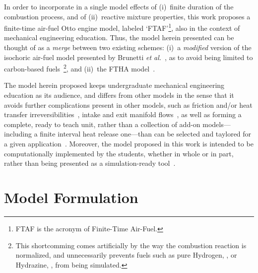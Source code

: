     In order to incorporate in a single model effects of (i)~finite duration of the combustion  process,  and  of  (ii)~reactive
    mixture properties, this work proposes a finite-time air-fuel Otto engine model, labeled `FTAF'\footnote{FTAF is the acronym
    of Finite-Time Air-Fuel.}, also in the context of mechanical engineering education. Thus, the model herein presented can  be
    thought of as a \emph{merge} between two existing schemes: (i)~a \emph{modified} version of  the  isochoric  air-fuel  model
    presented  by  Brunetti  \emph{et  al.\/}~\cite{2012-BrunettiF-Blucher},  as  to  avoid  being   limited   to   carbon-based
    fuels~\footnote{This shortcomming comes artificially by the way the combustion reaction  is  normalized,  and  unnecessarily
    prevents fuels such as pure  Hydrogen,  ,  or  Hydrazine,  ,  from  being  simulated.},  and  (ii)~the  FTHA
    model~\cite{2017-NaaktgeborenC-IntJMechEngEduc}.

    The model herein proposed keeps undergraduate mechanical engineering education as  its  audience,  and  differs  from  other
    models in the sense that it avoids further complications present in other models, such  as  friction  and/or  heat  transfer
    irreversibilities~\cite{2008-CurtoRissoPL+HernandezAC-JApplPhys, 2002-CatonJA-IntJMechEngEduc},  intake  and  exit  manifold
    flows~\cite{2001-CatonJA-IntJMechEngEduc}, as well as forming a complete, ready to teach unit, rather than a  collection  of
    add-on  models---including  a  finite  interval  heat  release  one---than  can  be  selected  and  taylored  for  a   given
    application~\cite{2013-MartinsJJG-Publindustria}.  Moreover,  the  model  proposed  in  this  work   is   intended   to   be
    computationally implemented by the students, whether in whole or in part, rather than being presented as a  simulation-ready
    tool~\cite{2011-ZuecoJ-IntJMechEngEduc}.



\section{Model Formulation}\label{sec:model}

